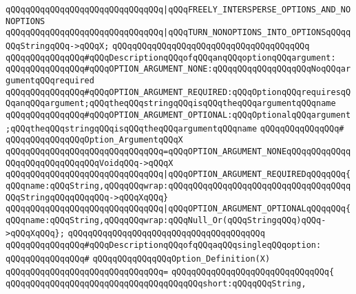 \verb|qQQqqQQqqQQqqQQqqQQqqQQqqQQqqQQq|\verb#|qQQqFREELY_INTERSPERSE_OPTIONS_AND_NONOPTIONS#\newline
\verb|qQQqqQQqqQQqqQQqqQQqqQQqqQQqqQQq|\verb#|qQQqTURN_NONOPTIONS_INTO_OPTIONSqQQqqQQqStringqQQq->qQQqX;#\newline
\newline
\newline
\verb|qQQqqQQqqQQqqQQqqQQqqQQqqQQqqQQqqQQqqQQq|\newline
\verb|qQQqqQQqqQQqqQQq#qQQqDescriptionqQQqofqQQqanqQQqoptionqQQqargument:|\newline
\verb|qQQqqQQqqQQqqQQq#qQQqOPTION_ARGUMENT_NONE:qQQqqQQqqQQqqQQqqQQqNoqQQqargumentqQQqrequired|\newline
\verb|qQQqqQQqqQQqqQQq#qQQqOPTION_ARGUMENT_REQUIRED:qQQqOptionqQQqrequiresqQQqanqQQqargument;qQQqtheqQQqstringqQQqisqQQqtheqQQqargumentqQQqname|\newline
\verb|qQQqqQQqqQQqqQQq#qQQqOPTION_ARGUMENT_OPTIONAL:qQQqOptionalqQQqargument;qQQqtheqQQqstringqQQqisqQQqtheqQQqargumentqQQqname|\newline
\verb|qQQqqQQqqQQqqQQq#|\newline
\verb|qQQqqQQqqQQqqQQqOption_ArgumentqQQqX|\newline
\verb|qQQqqQQqqQQqqQQqqQQqqQQqqQQqqQQq=qQQqOPTION_ARGUMENT_NONEqQQqqQQqqQQqqQQqqQQqqQQqqQQqqQQqVoidqQQq->qQQqX|\newline
\verb|qQQqqQQqqQQqqQQqqQQqqQQqqQQqqQQq|\verb#|qQQqOPTION_ARGUMENT_REQUIREDqQQqqQQq{qQQqname:qQQqString,qQQqqQQqwrap:qQQqqQQqqQQqqQQqqQQqqQQqqQQqqQQqqQQqqQQqStringqQQqqQQqqQQq->qQQqXqQQq}#\newline
\verb|qQQqqQQqqQQqqQQqqQQqqQQqqQQqqQQq|\verb#|qQQqOPTION_ARGUMENT_OPTIONALqQQqqQQq{qQQqname:qQQqString,qQQqqQQqwrap:qQQqNull_Or(qQQqStringqQQq)qQQq->qQQqXqQQq};#\newline
\newline
\newline
\verb|qQQqqQQqqQQqqQQqqQQqqQQqqQQqqQQqqQQqqQQq|\newline
\verb|qQQqqQQqqQQqqQQq#qQQqDescriptionqQQqofqQQqaqQQqsingleqQQqoption:|\newline
\verb|qQQqqQQqqQQqqQQq#|\newline
\verb|qQQqqQQqqQQqqQQqOption_Definition(X)|\newline
\verb|qQQqqQQqqQQqqQQqqQQqqQQqqQQqqQQq=|\newline
\verb|qQQqqQQqqQQqqQQqqQQqqQQqqQQqqQQq{|\newline
\verb|qQQqqQQqqQQqqQQqqQQqqQQqqQQqqQQqqQQqqQQqshort:qQQqqQQqString,|\newline
